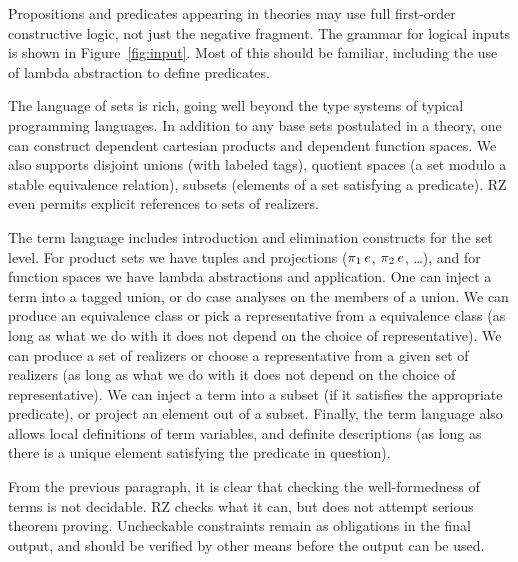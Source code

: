 Propositions and predicates appearing in theories may use full
first-order constructive logic, not just the negative fragment. 
\iflong
The grammar for logical inputs is shown in Figure~\ref{fig:input}. Most of
this should be familiar, including the use of lambda abstraction to
define predicates.
\fi

The language of sets is rich, going well beyond the type systems of
typical programming languages. In addition to any base sets postulated
in a theory, one can construct dependent cartesian products and
dependent function spaces. We also supports disjoint unions (with
labeled tags), quotient spaces (a set modulo a stable equivalence
relation), subsets (elements of a set satisfying a predicate). RZ even
permits explicit references to sets of realizers.

The term language includes introduction and elimination constructs
for the set level. For product sets we have
tuples and projections ($\mathop{\pi_{1}} e$, $\mathop{\pi_{2}} e$, \ldots),
and for function spaces we have lambda abstractions and application.
One can inject a term into a tagged union, or do case analyses
on the members of a union. We can produce an equivalence class or pick a representative from a equivalence class (as
long as what we do with it does not depend on the choice of
representative). We can produce a set of realizers
or choose a representative from a given set of realizers
(as long as what we do with it does not depend on the choice of
representative). We can inject a term into a subset (if it satisfies
the appropriate predicate), or project an element out of a subset. 
Finally, the term language also allows local
definitions of term variables, and definite descriptions (as long as
there is a unique element satisfying the predicate in question).

From the previous paragraph, it is
clear that checking the well-formedness of terms is not decidable. RZ
checks what it can, but does not attempt serious theorem proving.
Uncheckable constraints remain as obligations
in the final output, and should be verified by other means before
the output can be used.


